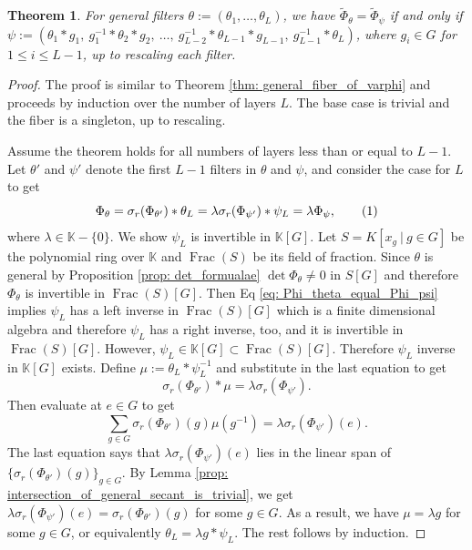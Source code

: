 \documentclass[final]{article}
\newcommand\numberthis{\addtocounter{equation}{1}\tag{\theequation}}
\newcommand{\K}{\mathbb{K}}
\newcommand{\conv}{\ast}
\theoremstyle{definition}
\theoremstyle{plain}
\newtheorem{theorem}[definition]{Theorem}
\begin{document}
\begin{theorem}\label{thm: general_fiber_of_Phi}
    For general filters $\theta:=(\theta_1, \dots, \theta_L)$, we have $\tilde \Phi_\theta =\tilde \Phi_\psi$ if and only if $\psi:=(\theta_1 \conv g_1,\  g_1^{-1}\conv \theta_2 \conv g_2,\  \dots,\  g_{L-2}^{-1}\conv \theta_{L-1} \conv g_{L-1},\ g_{L-1}^{-1}\conv \theta_L)$, where $g_i \in G$ for $1\leq i\leq L-1$, up to rescaling each filter.
\end{theorem}

\begin{proof}
    The proof is similar to Theorem \ref{thm: general_fiber_of_varphi} and proceeds by induction over the number of layers $L$. The base case is trivial and the fiber is a singleton, up to rescaling.

    Assume the theorem holds for all numbers of layers less than or equal to $L-1$.
    Let $\theta'$ and $\psi'$ denote the first $L-1$ filters in $\theta$ and $\psi$, and consider the case for $L$ to get
    \[
    \Phi_\theta 
    = \sigma_r(\Phi_{\theta'}) \conv \theta_L 
    = \lambda \sigma_r(\Phi_{\psi'}) \conv \psi_L 
    = \lambda \Phi_\psi, \numberthis \label{eq: Phi_theta_equal_Phi_psi}
    \]
    where $\lambda \in \K-\{0\}$. 
    We show $\psi_L$ is invertible in $\K[G]$. 
    Let $S= K[x_g\ |\ g\in G]$ be the polynomial ring over $\K$  and $\operatorname{Frac}(S)$ be its field of fraction.
    Since $\theta$ is general by Proposition \ref{prop: det_formualae} $\det \Phi_\theta \neq 0$ in $S[G]$ and therefore $\Phi_\theta$ is invertible in $\operatorname{Frac}(S)[G]$. 
    Then Eq \eqref{eq: Phi_theta_equal_Phi_psi} implies $\psi_L$ has a left inverse in $\operatorname{Frac}(S)[G]$ which is a finite dimensional algebra and therefore $\psi_L$ has a right inverse, too, and it is invertible in $\operatorname{Frac}(S)[G]$. However, $\psi_L \in \K[G] \subset \operatorname{Frac}(S)[G]$. Therefore $\psi_L$ inverse in $\K[G]$ exists.
    Define $\mu:= \theta_L \conv \psi_L^{-1}$ and substitute in the last equation to get
        \[
    \sigma_r(\Phi_{\theta'}) \conv \mu = \lambda \sigma_r(\Phi_{\psi'}).
    \]
    Then evaluate at $e \in G$ to get
            \[
    \sum_{g\in G}\sigma_r(\Phi_{\theta'})(g) \mu(g^{-1}) = \lambda \sigma_r(\Phi_{\psi'})(e).
    \]
    The last equation says that $\lambda \sigma_r(\Phi_{\psi'})(e)$ lies in the linear span of $\{\sigma_r(\Phi_{\theta'})(g)\}_{g\in G}$. 
     By Lemma \ref{prop: intersection_of_general_secant_is_trivial}, we get $\lambda \sigma_r(\Phi_{\psi'})(e) = \sigma_r(\Phi_{\theta'})(g)$ for some $g\in G$. 
    As a result, we have $\mu = \lambda g$ for some $g\in G$, or equivalently $\theta_L = \lambda g\conv \psi_L$.
    The rest follows by induction.    
    
\end{proof}
\end{document}
